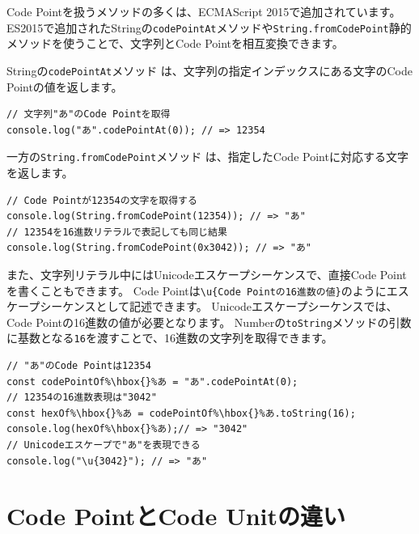 Code Pointを扱うメソッドの多くは、ECMAScript 2015で追加されています。
ES2015で追加されたStringの\texttt{codePointAt}メソッドや\texttt{String.fromCodePoint}静的メソッドを使うことで、文字列とCode
Pointを相互変換できます。

Stringの\texttt{codePointAt}メソッド\,\protect{}\,は、文字列の指定インデックスにある文字のCode
Pointの値を返します。

\begin{lstlisting}
// 文字列"あ"のCode Pointを取得
console.log("あ".codePointAt(0)); // => 12354
\end{lstlisting}

一方の\texttt{String.fromCodePoint}メソッド\,\protect{}\,は、指定したCode
Pointに対応する文字を返します。

\begin{lstlisting}
// Code Pointが12354の文字を取得する
console.log(String.fromCodePoint(12354)); // => "あ"
// 12354を16進数リテラルで表記しても同じ結果
console.log(String.fromCodePoint(0x3042)); // => "あ"
\end{lstlisting}

また、文字列リテラル中にはUnicodeエスケープシーケンスで、直接Code
Pointを書くこともできます。 Code
Pointは\texttt{\textbackslash u\{Code Pointの16進数の値\}}のようにエスケープシーケンスとして記述できます。
Unicodeエスケープシーケンスでは、Code
Pointの16進数の値が必要となります。
Numberの\texttt{toString}メソッドの引数に基数となる\texttt{16}を渡すことで、16進数の文字列を取得できます。

\begin{lstlisting}[escapechar=\%]
// "あ"のCode Pointは12354
const codePointOf%\hbox{}%あ = "あ".codePointAt(0);
// 12354の16進数表現は"3042"
const hexOf%\hbox{}%あ = codePointOf%\hbox{}%あ.toString(16);
console.log(hexOf%\hbox{}%あ);// => "3042"
// Unicodeエスケープで"あ"を表現できる
console.log("\u{3042}"); // => "あ"
\end{lstlisting}

\hypertarget{code-point-is-not-code-unit}{%
\section{Code PointとCode
Unitの違い}\label{code-point-is-not-code-unit}}

